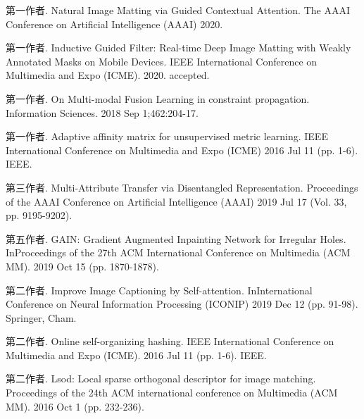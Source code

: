 \begin{publications*}
  \item 第一作者. Natural Image Matting via Guided Contextual Attention. The AAAI Conference on Artificial Intelligence (AAAI) 2020.
  \item 第一作者. Inductive Guided Filter: Real-time Deep Image Matting with Weakly Annotated Masks on Mobile Devices. IEEE International Conference on Multimedia and Expo (ICME). 2020. accepted.
  \item 第一作者. On Multi-modal Fusion Learning in constraint propagation. Information Sciences. 2018 Sep 1;462:204-17.
  \item 第一作者. Adaptive affinity matrix for unsupervised metric learning. IEEE International Conference on Multimedia and Expo (ICME) 2016 Jul 11 (pp. 1-6). IEEE.
  \item 第三作者. Multi-Attribute Transfer via Disentangled Representation. Proceedings of the AAAI Conference on Artificial Intelligence (AAAI) 2019 Jul 17 (Vol. 33, pp. 9195-9202).
  \item 第五作者. GAIN: Gradient Augmented Inpainting Network for Irregular Holes. InProceedings of the 27th ACM International Conference on Multimedia (ACM MM). 2019 Oct 15 (pp. 1870-1878).
  \item 第二作者. Improve Image Captioning by Self-attention. InInternational Conference on Neural Information Processing (ICONIP) 2019 Dec 12 (pp. 91-98). Springer, Cham.
  \item 第二作者. Online self-organizing hashing. IEEE International Conference on Multimedia and Expo (ICME). 2016 Jul 11 (pp. 1-6). IEEE.
  \item 第二作者. Lsod: Local sparse orthogonal descriptor for image matching. Proceedings of the 24th ACM international conference on Multimedia (ACM MM). 2016 Oct 1 (pp. 232-236).

\end{publications*}

